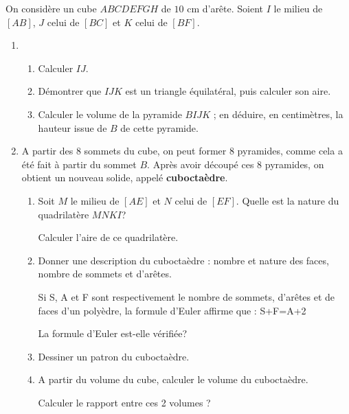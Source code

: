 
%
On considère un cube $ABCDEFGH$ de $10$ cm d'arête. Soient $I$ le milieu de $[AB]$, $J$ celui de $[BC]$ et $K$ celui de $[BF]$.

\begin{center}
\end{center}
\begin{enumerate}
     \item
     \begin{enumerate}
          \item
          Calculer $IJ$.
          \item
          Démontrer que $IJK$ est un triangle équilatéral, puis calculer son aire.
          \item
          Calculer le volume de la pyramide $BIJK$ ; en déduire, en centimètres, la hauteur issue de $B$ de cette pyramide.
     \end{enumerate}
     \item
     A partir des 8 sommets du cube, on peut former 8 pyramides, comme cela a été fait à partir du sommet $B$. Après avoir découpé ces 8 pyramides, on obtient un nouveau solide, appelé  \textbf{cuboctaèdre}.
     \begin{enumerate}
          \item
          Soit $M$ le milieu de $[AE]$ et $N$ celui de $[EF]$. Quelle est la nature du quadrilatère $MNKI$?
          \par
          Calculer l'aire de ce quadrilatère.
          \item
          Donner une description du cuboctaèdre : nombre et nature des faces, nombre de sommets et d'arêtes.
          \par
          Si S, A et F sont respectivement le nombre de sommets, d'arêtes et de faces d'un polyèdre, la formule d'Euler affirme que : S+F=A+2
          \par
          La formule d'Euler est-elle vérifiée?
          \item
          Dessiner un patron du cuboctaèdre.
          \item
          A partir du volume du cube, calculer le volume du cuboctaèdre.
          \par
          Calculer le rapport entre ces 2 volumes ?
     \end{enumerate}
\end{enumerate}
